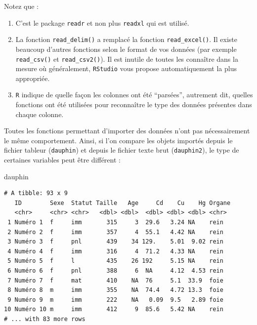 \documentclass[
  letterpaper,
  DIV=11,
  numbers=noendperiod]{scrreprt}
\newenvironment{Shaded}{\begin{snugshade}}{\end{snugshade}}
\newcommand{\NormalTok}[1]{\textcolor[rgb]{0.00,0.23,0.31}{#1}}
\providecommand{\tightlist}{%
  \setlength{\itemsep}{0pt}\setlength{\parskip}{0pt}}\usepackage{longtable,booktabs,array}
\begin{document}
Notez que :

\begin{enumerate}
\def\labelenumi{\arabic{enumi}.}
\tightlist
\item
  C'est le package \texttt{readr} et non plus \texttt{readxl} qui est
  utilisé.
\item
  La fonction \texttt{read\_delim()} a remplacé la fonction
  \texttt{read\_excel()}. Il existe beaucoup d'autres fonctions selon le
  format de vos données (par exemple \texttt{read\_csv()} et
  \texttt{read\_csv2()}). Il est inutile de toutes les connaître dans la
  mesure où généralement, \texttt{RStudio} vous propose automatiquement
  la plus appropriée.
\item
  \texttt{R} indique de quelle façon les colonnes ont été ``parsées'',
  autrement dit, quelles fonctions ont été utilisées pour reconnaître le
  type des données présentes dans chaque colonne.
\end{enumerate}

Toutes les fonctions permettant d'importer des données n'ont pas
nécessairement le même comportement. Ainsi, si l'on compare les objets
importés depuis le fichier tableur (\texttt{dauphin}) et depuis le
fichier texte brut (\texttt{dauphin2}), le type de certaines variables
peut être différent :

\begin{Shaded}
\begin{Highlighting}[]
\NormalTok{dauphin}
\end{Highlighting}
\end{Shaded}

\begin{verbatim}
# A tibble: 93 x 9
   ID        Sexe  Statut Taille   Age     Cd    Cu    Hg Organe
   <chr>     <chr> <chr>   <dbl> <dbl>  <dbl> <dbl> <dbl> <chr> 
 1 Numéro 1  f     imm       315     3  29.6   3.24 NA    rein  
 2 Numéro 2  f     imm       357     4  55.1   4.42 NA    rein  
 3 Numéro 3  f     pnl       439    34 129.    5.01  9.02 rein  
 4 Numéro 4  f     imm       316     4  71.2   4.33 NA    rein  
 5 Numéro 5  f     l         435    26 192     5.15 NA    rein  
 6 Numéro 6  f     pnl       388     6  NA     4.12  4.53 rein  
 7 Numéro 7  f     mat       410    NA  76     5.1  33.9  foie  
 8 Numéro 8  m     imm       355    NA  74.4   4.72 13.3  foie  
 9 Numéro 9  m     imm       222    NA   0.09  9.5   2.89 foie  
10 Numéro 10 m     imm       412     9  85.6   5.42 NA    rein  
# ... with 83 more rows
\end{verbatim}
\end{document}
